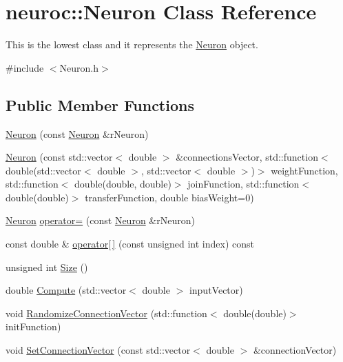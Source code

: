 \hypertarget{classneuroc_1_1_neuron}{\section{neuroc\-:\-:Neuron Class Reference}
\label{classneuroc_1_1_neuron}
}


This is the lowest class and it represents the \hyperlink{classneuroc_1_1_neuron}{Neuron} object.  




{\ttfamily \#include $<$Neuron.\-h$>$}

\subsection*{Public Member Functions}
\begin{DoxyCompactItemize}
\item 
\hyperlink{classneuroc_1_1_neuron_a5daa71d6894902abd4d176fb98b2a1a3}{Neuron} (const \hyperlink{classneuroc_1_1_neuron}{Neuron} \&r\-Neuron)
\item 
\hyperlink{classneuroc_1_1_neuron_afca9457b9302079c19680fc3d75d080a}{Neuron} (const std\-::vector$<$ double $>$ \&connections\-Vector, std\-::function$<$ double(std\-::vector$<$ double $>$, std\-::vector$<$ double $>$)$>$ weight\-Function, std\-::function$<$ double(double, double)$>$ join\-Function, std\-::function$<$ double(double)$>$ transfer\-Function, double bias\-Weight=0)
\item 
\hyperlink{classneuroc_1_1_neuron}{Neuron} \hyperlink{classneuroc_1_1_neuron_a50f9501ff50f8cba29509adf982d276e}{operator=} (const \hyperlink{classneuroc_1_1_neuron}{Neuron} \&r\-Neuron)
\item 
const double \& \hyperlink{classneuroc_1_1_neuron_aebf0a0ac505ed3d030a2317f7e8db166}{operator\mbox{[}$\,$\mbox{]}} (const unsigned int index) const 
\item 
unsigned int \hyperlink{classneuroc_1_1_neuron_a015376f3e8345e7d831298d4342eef3f}{Size} ()
\item 
double \hyperlink{classneuroc_1_1_neuron_aeb1a05ddba04af38d8ab9fd88d74ba69}{Compute} (std\-::vector$<$ double $>$ input\-Vector)
\item 
void \hyperlink{classneuroc_1_1_neuron_a9fbb34828b715886d122765d9889f000}{Randomize\-Connection\-Vector} (std\-::function$<$ double(double)$>$ init\-Function)
\item 
void \hyperlink{classneuroc_1_1_neuron_a66bfce757756e313b9d206340f559657}{Set\-Connection\-Vector} (const std\-::vector$<$ double $>$ \&connection\-Vector)

\end{DoxyCompactItemize}
